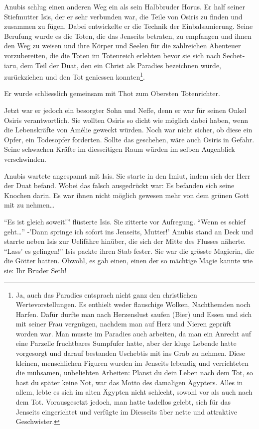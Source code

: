 \documentclass[11pt,titlepage,a5paper]{book}
\begin{document}
Anubis schlug einen anderen Weg ein als sein Halbbruder Horus. Er half seiner Stiefmutter Isis, der er sehr verbunden war, die Teile von Osiris zu finden und zusammen zu fügen. Dabei entwickelte er die Technik der Einbalsamierung. Seine Berufung wurde es die Toten, die das Jenseits betraten, zu empfangen und ihnen den Weg zu weisen und ihre Körper und Seelen für die zahlreichen Abenteuer vorzubereiten, die die Toten im Totenreich erlebten bevor sie sich nach Sechet-iaru, dem Teil der Duat, den ein Christ als Paradies bezeichnen würde, zurückziehen und den Tot geniessen konnten\footnote{Ja, auch das Paradies entsprach nicht ganz den christlichen Wertevorstellungen. Es enthielt weder flauschige Wolken, Nachthemden noch Harfen. Dafür durfte man nach Herzenslust saufen (Bier) und Essen und sich mit seiner Frau vergnügen, nachdem man auf Herz und Nieren geprüft worden war. Man musste im Paradies auch arbeiten, da man ein Anrecht auf eine Parzelle fruchtbares Sumpfufer hatte, aber der kluge Lebende hatte vorgesorgt und darauf bestanden Uschebtis mit ins Grab zu nehmen. Diese kleinen, menschlichen Figuren wurden im Jenseits lebendig und verrichteten die mühsamen, unbeliebten Arbeiten: Planst du dein Leben nach dem Tot, so hast du später keine Not, war das Motto des damaligen Ägypters. Alles in allem, lebte es sich im alten Ägypten nicht schlecht, sowohl vor als auch nach dem Tot. Vorausgesetzt jedoch, man hatte tadellos gelebt, sich für das Jenseits eingerichtet und verfügte im Diesseits über nette und attraktive Geschwister.}.

Er wurde schliesslich gemeinsam mit Thot zum Obersten Totenrichter. 

Jetzt war er jedoch ein besorgter Sohn und Neffe, denn er war für seinen Onkel Osiris verantwortlich. Sie wollten Osiris so dicht wie möglich dabei haben, wenn die Lebenskräfte von Amélie geweckt würden. Noch war nicht sicher, ob diese ein Opfer, ein Todesopfer forderten. Sollte das geschehen, wäre auch Osiris in Gefahr. Seine schwachen Kräfte im diesseitigen Raum würden im selben Augenblick verschwinden.

Anubis wartete angespannt mit Isis. Sie starte in den Imiut, indem sich der Herr der Duat befand. Wobei das falsch ausgedrückt war: Es befanden sich seine Knochen darin. Es war ihnen nicht möglich gewesen mehr von dem grünen Gott mit zu nehmen\dots

"`Es ist gleich soweit!"' flüsterte Isis. Sie zitterte vor Aufregung. "`Wenn es schief geht\dots"' -'Dann springe ich sofort ins Jenseits, Mutter!' Anubis stand an Deck und starrte neben Isis zur Uelifähre hinüber, die sich der Mitte des Flusses näherte. "`Lass' es gelingen!"' Isis packte ihren Stab fester. Sie war die grösste Magierin, die die Götter hatten. Obwohl, es gab einen, einen der so mächtige Magie kannte wie sie: Ihr Bruder Seth!
\end{document}
